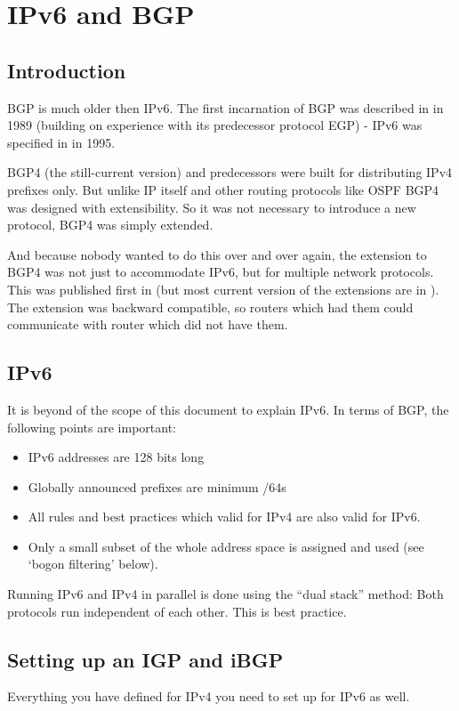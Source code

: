 \chapter{IPv6 and BGP}
\section{Introduction}
BGP is much older then IPv6. The first incarnation of BGP was described in  in 1989 (building on experience with its predecessor protocol \gls{EGP}) - IPv6 was specified in  in 1995.

BGP4 (the still-current version) and predecessors were built for distributing IPv4 prefixes only. But unlike IP itself and other routing protocols like \gls{OSPF} BGP4 was designed with extensibility. So it was not necessary to introduce a new protocol, BGP4 was simply extended.

And because nobody wanted to do this over and over again, the extension to BGP4 was not just to accommodate IPv6, but for multiple network protocols. This was published first in  (but most current version of the extensions are in ). The extension was backward compatible, so routers which had them could communicate with router which did not have them.

\section{IPv6}
It is beyond of the scope of this document to explain IPv6. In terms of BGP, the following points are important:
\begin{itemize}
  \item IPv6 addresses are 128 bits long
  \item Globally announced prefixes are minimum /64s
  \item All rules and best practices which valid for IPv4 are also valid for IPv6.
  \item Only a small subset of the whole address space is assigned and used (see `bogon filtering' below).
\end{itemize}

Running IPv6 and IPv4 in parallel is done using the ``dual stack'' method: Both protocols run independent of each other. This is best practice.

\section{Setting up an IGP and iBGP}
Everything you have defined for IPv4 you need to set up for IPv6 as well.

